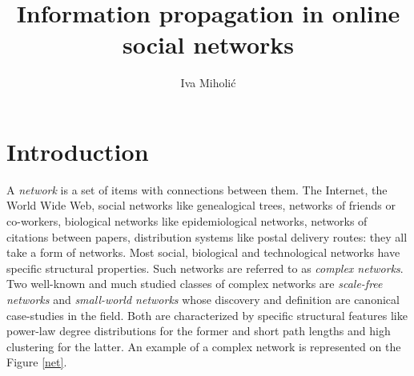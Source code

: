 \documentclass[times, utf8, zavrsni]{fer}
\begin{document}

\title{Information propagation in online social networks}

\author{Iva Miholić}

\maketitle


\tableofcontents
\clearpage
\listoffigures
\listoftables

\chapter{Introduction}

A \emph{network} is a set of items with connections between them. The Internet, the World Wide Web, social networks like genealogical trees, networks of friends or co-workers, biological networks like epidemiological networks, networks of citations between papers, distribution systems like postal delivery routes: they all take a form of networks. Most social, biological and technological networks have specific structural properties. Such networks are referred to as \emph{complex networks}. Two well-known and much studied classes of complex networks are \emph{scale-free networks} and \emph{small-world networks} whose discovery and definition are canonical case-studies in the field. Both are characterized by specific structural features like power-law degree distributions for the former and short path lengths and high clustering for the latter. An example of a complex network is represented on the Figure \ref{net}.
\end{document}
